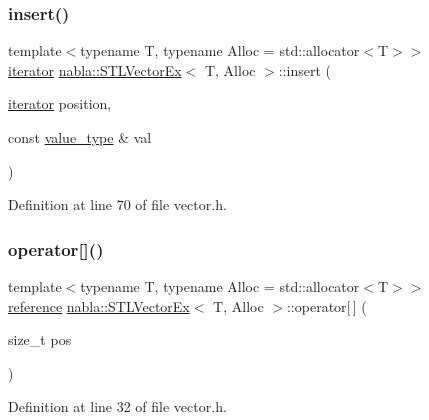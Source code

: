 \subsubsection{\texorpdfstring{insert()}{insert()}}
{\footnotesize\ttfamily template$<$typename T, typename Alloc = std\+::allocator$<$\+T$>$$>$ \\
\mbox{\hyperlink{classnabla_1_1_s_t_l_vector_ex_a4bd3bc9bbe369d76e958f3180c22f40b}{iterator}} \mbox{\hyperlink{classnabla_1_1_s_t_l_vector_ex}{nabla\+::\+S\+T\+L\+Vector\+Ex}}$<$ T, Alloc $>$\+::insert (\begin{DoxyParamCaption}\item[{\mbox{\hyperlink{classnabla_1_1_s_t_l_vector_ex_a4bd3bc9bbe369d76e958f3180c22f40b}{iterator}}}]{position,  }\item[{const \mbox{\hyperlink{classnabla_1_1_s_t_l_vector_ex_a6af5809443fb78a0fe7321ff93e2ad4c}{value\+\_\+type}} \&}]{val }\end{DoxyParamCaption})\hspace{0.3cm}{\ttfamily [inline]}}



Definition at line 70 of file vector.\+h.

\mbox{\label{classnabla_1_1_s_t_l_vector_ex_afde528e33bdf0672764cc4047609461f}} 
\subsubsection{\texorpdfstring{operator[]()}{operator[]()}}
{\footnotesize\ttfamily template$<$typename T, typename Alloc = std\+::allocator$<$\+T$>$$>$ \\
\mbox{\hyperlink{classnabla_1_1_s_t_l_vector_ex_a6adf5d87234352c139af2d48f4787ed5}{reference}} \mbox{\hyperlink{classnabla_1_1_s_t_l_vector_ex}{nabla\+::\+S\+T\+L\+Vector\+Ex}}$<$ T, Alloc $>$\+::operator\mbox{[}$\,$\mbox{]} (\begin{DoxyParamCaption}\item[{size\+\_\+t}]{pos }\end{DoxyParamCaption})\hspace{0.3cm}{\ttfamily [inline]}}



Definition at line 32 of file vector.\+h.

